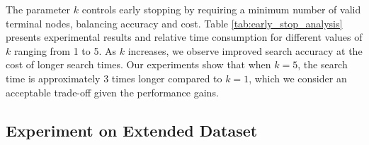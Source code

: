 \begin{table}
\caption{Results with different early stop thresholds. Time shows runtime relative to k=1.}
\label{tab:early_stop_analysis}
\end{table}

The parameter $k$ controls early stopping by requiring a minimum number of valid terminal nodes, balancing accuracy and cost.
Table \ref{tab:early_stop_analysis} presents experimental results and relative time consumption for different values of $k$ ranging from 1 to 5. As $k$ increases, we observe improved search accuracy at the cost of longer search times. Our experiments show that when $k=5$, the search time is approximately 3 times longer compared to $k=1$, which we consider an acceptable trade-off given the performance gains.


\subsection{Experiment on Extended Dataset}
\label{sec:extended_dataset_experiment}

